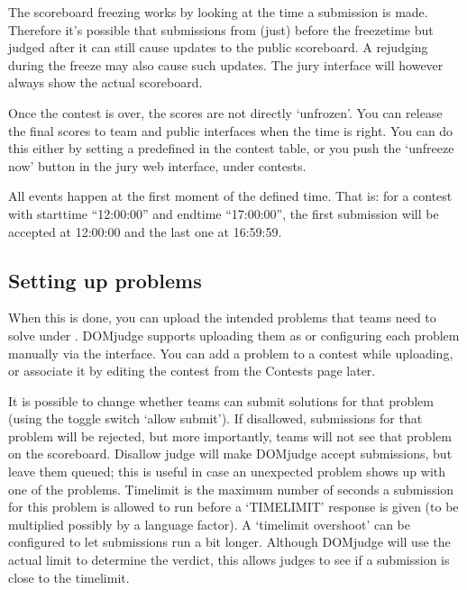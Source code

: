 \documentclass[a4paper,10pt,english,openany]{sphinxmanual}
\begin{document}
\sphinxAtStartPar
The scoreboard freezing works by looking at the time a submission is
made. Therefore it’s possible that submissions from (just) before the
freezetime but judged after it can still cause updates to the public
scoreboard. A rejudging during the freeze may also cause such updates.
The jury interface will however always show the actual
scoreboard.

\sphinxAtStartPar
Once the contest is over, the scores are not directly ‘unfrozen’.
You can release the final scores to team and public interfaces when the
time is right. You can do this either by setting a predefined
 in the contest table, or you push the ‘unfreeze
now’ button in the jury web interface, under contests.

\sphinxAtStartPar
All events happen at the first moment of the defined time. That is:
for a contest with starttime “12:00:00” and endtime “17:00:00”, the
first submission will be accepted at 12:00:00 and the last one at
16:59:59.


\subsection{Setting up problems}
\label{\detokenize{config-basic:setting-up-problems}}
\sphinxAtStartPar
When this is done, you can upload the intended
problems that teams need to solve under . DOMjudge supports
uploading them as {\hyperref[\detokenize{problem-format::doc}]{}} or configuring
each problem manually via the interface. You can add a problem to a
contest while uploading, or associate it by editing the contest
from the Contests page later.

\sphinxAtStartPar
It is possible to change whether teams can submit solutions for that
problem (using the toggle switch ‘allow submit’). If disallowed,
submissions for that problem will be rejected, but more importantly,
teams will not see that problem on the scoreboard. Disallow judge
will make DOMjudge accept submissions, but leave them queued; this
is useful in case an unexpected problem shows up with one of the
problems. Timelimit is the maximum number of seconds a submission
for this problem is allowed to run before a ‘TIMELIMIT’ response
is given (to be multiplied possibly by a language factor). A
‘timelimit overshoot’ can be configured to let submissions run a
bit longer. Although DOMjudge will use the actual limit to
determine the verdict, this allows judges to see if a submission
is close to the timelimit.
\end{document}
